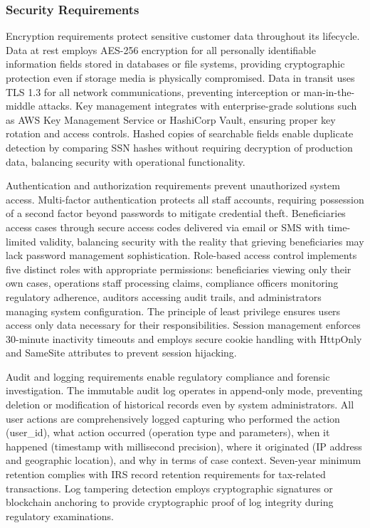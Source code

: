 \subsubsection{Security Requirements}

Encryption requirements protect sensitive customer data throughout its lifecycle. Data at rest employs AES-256 encryption for all personally identifiable information fields stored in databases or file systems, providing cryptographic protection even if storage media is physically compromised. Data in transit uses TLS 1.3 for all network communications, preventing interception or man-in-the-middle attacks. Key management integrates with enterprise-grade solutions such as AWS Key Management Service or HashiCorp Vault, ensuring proper key rotation and access controls. Hashed copies of searchable fields enable duplicate detection by comparing SSN hashes without requiring decryption of production data, balancing security with operational functionality.

Authentication and authorization requirements prevent unauthorized system access. Multi-factor authentication protects all staff accounts, requiring possession of a second factor beyond passwords to mitigate credential theft. Beneficiaries access cases through secure access codes delivered via email or SMS with time-limited validity, balancing security with the reality that grieving beneficiaries may lack password management sophistication. Role-based access control implements five distinct roles with appropriate permissions: beneficiaries viewing only their own cases, operations staff processing claims, compliance officers monitoring regulatory adherence, auditors accessing audit trails, and administrators managing system configuration. The principle of least privilege ensures users access only data necessary for their responsibilities. Session management enforces 30-minute inactivity timeouts and employs secure cookie handling with HttpOnly and SameSite attributes to prevent session hijacking.

Audit and logging requirements enable regulatory compliance and forensic investigation. The immutable audit log operates in append-only mode, preventing deletion or modification of historical records even by system administrators. All user actions are comprehensively logged capturing who performed the action (user_id), what action occurred (operation type and parameters), when it happened (timestamp with millisecond precision), where it originated (IP address and geographic location), and why in terms of case context. Seven-year minimum retention complies with IRS record retention requirements for tax-related transactions. Log tampering detection employs cryptographic signatures or blockchain anchoring to provide cryptographic proof of log integrity during regulatory examinations.

